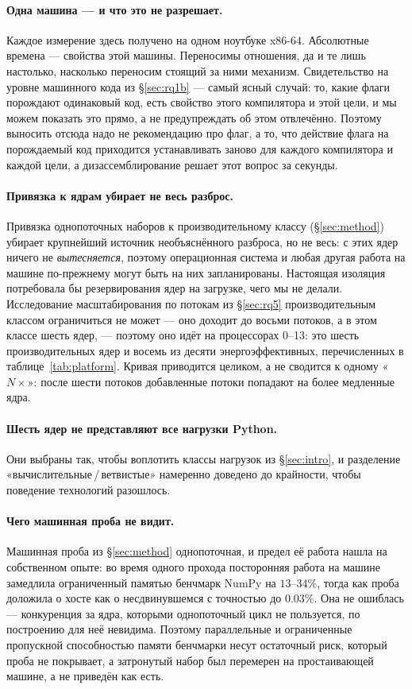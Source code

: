 \documentclass[10pt,a4paper]{article}
\begin{document}
\paragraph{Одна машина --- и что это не разрешает.} Каждое измерение здесь получено на одном
ноутбуке x86-64. Абсолютные времена --- свойства этой машины. Переносимы отношения, да и те лишь настолько,
насколько переносим стоящий за ними механизм. Свидетельство на уровне
машинного кода из \S\ref{sec:rq1b} --- самый ясный случай: то, какие флаги порождают одинаковый
код, есть свойство этого компилятора и этой цели, и мы можем показать это прямо, а не
предупреждать об этом отвлечённо. Поэтому выносить отсюда надо не рекомендацию про флаг, а то,
что действие флага на порождаемый код приходится устанавливать заново для каждого компилятора и
каждой цели, а дизассемблирование решает этот вопрос за секунды.

\paragraph{Привязка к ядрам убирает не весь разброс.} Привязка однопоточных наборов к
производительному классу (\S\ref{sec:method}) убирает
крупнейший источник необъяснённого разброса, но не весь: с этих ядер ничего не \emph{вытесняется},
поэтому операционная система и любая другая работа на машине по-прежнему могут быть на них
запланированы. Настоящая изоляция потребовала бы резервирования ядер на загрузке, чего мы не
делали. Исследование масштабирования по потокам из \S\ref{sec:rq5} производительным классом
ограничиться не может --- оно доходит до восьми потоков, а в этом классе шесть ядер, ---
поэтому оно идёт на процессорах 0--13: это шесть производительных ядер и восемь из десяти
энергоэффективных, перечисленных в таблице~\ref{tab:platform}. Кривая приводится целиком, а не
сводится к одному «$N\times$»: после шести потоков добавленные потоки попадают на более медленные
ядра.

\paragraph{Шесть ядер не представляют все нагрузки Python.} Они выбраны так,
чтобы воплотить классы нагрузок из \S\ref{sec:intro}, и разделение «вычислительные\,/\,ветвистые»
намеренно доведено до крайности, чтобы поведение технологий разошлось.

\paragraph{Чего машинная проба не видит.} Машинная проба из \S\ref{sec:method} однопоточная, и
предел её работа нашла на собственном опыте: во время
одного прохода посторонняя работа на машине замедлила ограниченный памятью бенчмарк NumPy на
$13$--$34\%$, тогда как проба доложила о хосте как о несдвинувшемся с точностью до $0.03\%$. Она не
ошиблась --- конкуренция за ядра, которыми однопоточный цикл не пользуется, по построению для неё
невидима. Поэтому параллельные и ограниченные пропускной способностью памяти бенчмарки несут
остаточный риск, который проба не покрывает, а затронутый набор был перемерен на простаивающей
машине, а не приведён как есть.
\end{document}
